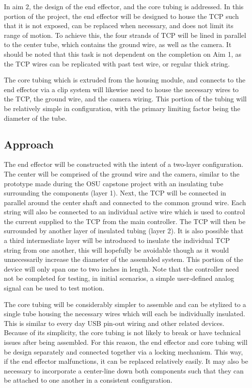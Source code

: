 In aim 2, the design of the end effector, and the core tubing is addressed. In this portion of the project, the end effector will be designed to house the TCP such that it is not exposed, can be replaced when necessary, and does not limit its range of motion. To achieve this, the four strands of TCP will be lined in parallel to the center tube, which contains the ground wire, as well as the camera. It should be noted that this task is not dependent on the completion on Aim 1, as the TCP wires can be replicated with past test wire, or regular thick string.

The core tubing which is extruded from the housing module, and connects to the end effector via a clip system will likewise need to house the necessary wires to the TCP, the ground wire, and the camera wiring. This portion of the tubing will be relatively simple in configuration, with the primary limiting factor being the diameter of the tube.

\subsection{Approach}

The end effector will be constructed with the intent of a two-layer configuration. The center will be comprised of the ground wire and the camera, similar to the prototype made during the OSU capstone project with an insulating tube surrounding the components (layer 1). Next, the TCP will be connected in parallel around the center shaft and connected to the common ground wire. Each string will also be connected to an individual active wire which is used to control the current supplied to the TCP from the main controller. The TCP will then be surrounded by another layer of insulated tubing (layer 2). It is also possible that a third intermediate layer will be introduced to insulate the individual TCP string from one another, this will hopefully be avoidable though as it would unnecessarily increase the diameter of the assembled system. This portion of the device will only span one to two inches in length. Note that the controller need not be completed for testing, in initial scenarios, a simple user-defined analog signal can be used to test motion.

The core tubing will be considerably simpler to assemble and can be stylized to a single tube housing the necessary wires which will each be individually insulated. This is similar to every day USB pin-out wiring and other related devices. Because of its simplicity, the core tubing is not likely to break or have technical issues after being assembled. For this reason, the end effector and core tubing will be design separately and connected together via a locking mechanism. This way, if the end effector malfunctions, it can be replaced relatively easily. It may also be necessary to incorporate a center-line down both components such that they can be attached to one another in a consistent configuration.

